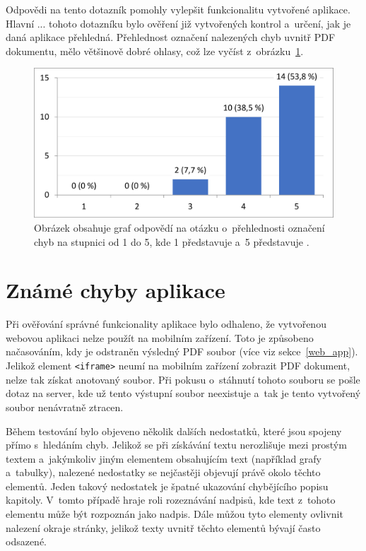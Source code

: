 Odpovědi na tento dotazník pomohly vylepšit funkcionalitu vytvořené aplikace.
Hlavní ... tohoto dotazníku bylo ověření již vytvořených kontrol a~určení,
jak je daná aplikace přehledná. Přehlednost označení nalezených chyb
uvnitř PDF dokumentu, mělo většinově dobré ohlasy, což lze
vyčíst z~obrázku~\ref{rate_checks}.

\begin{figure}[H]
    \centering
    \includegraphics[width=0.8\linewidth]{obrazky-figures/graph1.pdf}
    \caption{Obrázek obsahuje graf odpovědí na otázku o~přehlednosti
    označení chyb na stupnici od 1 do 5, kde 1 představuje 
    a~5 představuje .}
    \label{rate_checks}
\end{figure}




\section{Známé chyby aplikace} \label{app_errors}
Při ověřování správné funkcionality aplikace bylo odhaleno, že vytvořenou webovou aplikaci
nelze použít na mobilním zařízení. Toto je způsobeno načasováním, kdy je odstraněn
výsledný PDF soubor (více viz sekce~\ref{web_app}). Jelikož element
\texttt{<iframe>} neumí na mobilním zařízení zobrazit PDF dokument, nelze tak
získat anotovaný soubor. Při pokusu o~stáhnutí tohoto souboru se pošle dotaz
na server, kde už tento výstupní soubor neexistuje a~tak je tento vytvořený soubor
nenávratně ztracen.

Během testování bylo objeveno několik dalších nedostatků, které jsou spojeny přímo
s~hledáním chyb. Jelikož se při získávání textu nerozlišuje mezi prostým textem
a~jakýmkoliv jiným elementem obsahujícím text (například grafy a~tabulky),
nalezené nedostatky se nejčastěji objevují právě okolo těchto elementů. 
Jeden takový nedostatek je špatné ukazování chybějícího popisu kapitoly.
V~tomto případě hraje roli rozeznávání nadpisů, kde text z~tohoto elementu
může být rozpoznán jako nadpis. Dále můžou tyto elementy ovlivnit nalezení
okraje stránky, jelikož texty uvnitř těchto elementů bývají často odsazené.

